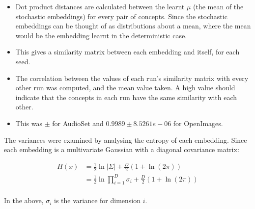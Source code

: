 \begin{itemize}
    \item Dot product distances are calculated between the learnt $\mu$ (the mean of the stochastic embeddings) for every pair of concepts. Since the stochastic embeddings can be thought of as distributions about a mean, where the mean would be the embedding learnt in the deterministic case. 
    \item This gives a similarity matrix between each embedding and itself, for each seed. 
    \item The correlation between the values of each run's similarity matrix with every other run was computed, and the mean value taken. A high value should indicate that the concepts in each run have the same similarity with each other. 
    \item This was $ \pm $ for AudioSet and $0.9989 \pm 8.5261e-06$ for OpenImages. 
\end{itemize}

The variances were examined by analysing the entropy of each embedding. Since each embedding is a multivariate Gaussian with a diagonal covariance matrix:

\begin{equation}
\begin{split}
H(x) &= \frac{1}{2} \ln |\Sigma| + \frac{D}{2}(1 + \ln(2 \pi))\\
&= \frac{1}{2} \ln \prod_{i=1}^D \sigma_i + \frac{D}{2}(1 + \ln(2 \pi))\\
\end{split}
\end{equation}

In the above, $\sigma_i$ is the variance for dimension $i$. 
 
